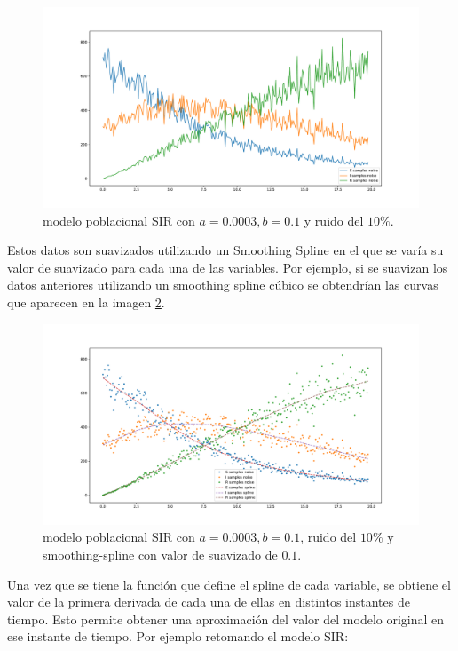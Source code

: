 \begin{figure}[h]
    \centering
    \includegraphics[width=\textwidth]{"figures/SIR_with_noise.pdf"}
    \caption{modelo poblacional SIR con $a = 0.0003, b = 0.1$ y ruido del $10\%$.}
    \label{fig:SIR_with_noise}
\end{figure}

Estos datos son suavizados utilizando un Smoothing Spline en el que se varía su valor de suavizado para cada una de las variables. Por ejemplo, si se suavizan los datos anteriores utilizando un smoothing spline cúbico se obtendrían las curvas que aparecen en la imagen \ref{fig:SIR_noise_with_spline}.

\begin{figure}[h]
    \centering
    \includegraphics[width=\textwidth]{"figures/SIR_noise_with_spline.pdf"}
    \caption{modelo poblacional SIR con $a = 0.0003, b = 0.1$, ruido del $10\%$ y smoothing-spline con valor de suavizado de $0.1$.}
    \label{fig:SIR_noise_with_spline}
\end{figure}

Una vez que se tiene la función que define el spline de cada variable, se obtiene el valor de la primera derivada de cada una de ellas en distintos instantes de tiempo. Esto permite obtener una aproximación del valor del modelo original en ese instante de tiempo. Por ejemplo retomando el modelo SIR:

